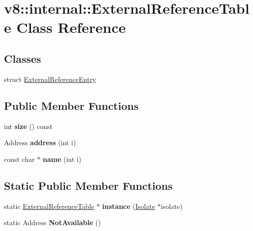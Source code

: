\hypertarget{classv8_1_1internal_1_1_external_reference_table}{}\section{v8\+:\+:internal\+:\+:External\+Reference\+Table Class Reference}
\label{classv8_1_1internal_1_1_external_reference_table}
\subsection*{Classes}
\begin{DoxyCompactItemize}
\item 
struct \hyperlink{structv8_1_1internal_1_1_external_reference_table_1_1_external_reference_entry}{External\+Reference\+Entry}
\end{DoxyCompactItemize}
\subsection*{Public Member Functions}
\begin{DoxyCompactItemize}
\item 
int {\bfseries size} () const \hypertarget{classv8_1_1internal_1_1_external_reference_table_a31ed81fd24ee078331b448fa62d7bbfe}{}\label{classv8_1_1internal_1_1_external_reference_table_a31ed81fd24ee078331b448fa62d7bbfe}

\item 
Address {\bfseries address} (int i)\hypertarget{classv8_1_1internal_1_1_external_reference_table_a50b3170564dc57ee820f3f4f65494fac}{}\label{classv8_1_1internal_1_1_external_reference_table_a50b3170564dc57ee820f3f4f65494fac}

\item 
const char $\ast$ {\bfseries name} (int i)\hypertarget{classv8_1_1internal_1_1_external_reference_table_a2c161796d916c906e6b1530376f89e5b}{}\label{classv8_1_1internal_1_1_external_reference_table_a2c161796d916c906e6b1530376f89e5b}

\end{DoxyCompactItemize}
\subsection*{Static Public Member Functions}
\begin{DoxyCompactItemize}
\item 
static \hyperlink{classv8_1_1internal_1_1_external_reference_table}{External\+Reference\+Table} $\ast$ {\bfseries instance} (\hyperlink{classv8_1_1internal_1_1_isolate}{Isolate} $\ast$isolate)\hypertarget{classv8_1_1internal_1_1_external_reference_table_a9424724def9b186059ce07339921c3a2}{}\label{classv8_1_1internal_1_1_external_reference_table_a9424724def9b186059ce07339921c3a2}

\item 
static Address {\bfseries Not\+Available} ()\hypertarget{classv8_1_1internal_1_1_external_reference_table_a9197272707dbd232553f673d0d3e58e1}{}\label{classv8_1_1internal_1_1_external_reference_table_a9197272707dbd232553f673d0d3e58e1}

\end{DoxyCompactItemize}
